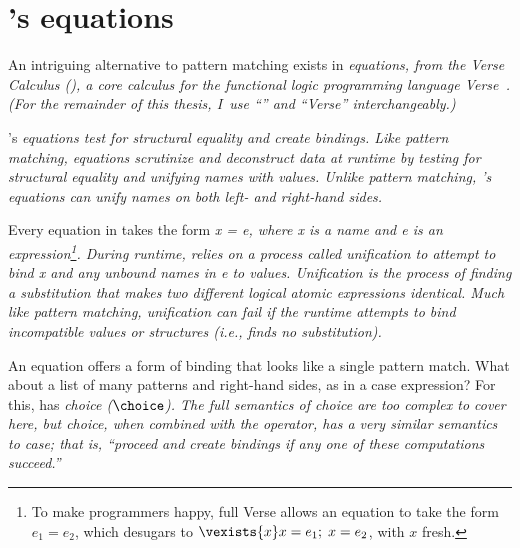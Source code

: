\documentclass[manuscript,screen,review, 12pt, nonacm]{acmart}
\begin{document}
    
    \section{\VC's equations}
    \label{verseoverobservers}

    An intriguing alternative to pattern matching exists in \it{equations}, from
    the Verse Calculus (\VC), a core calculus for the functional logic
    programming language \it{Verse}~\citep{antoy2010functional,
    hanus2013functional, verse}. (For the remainder of this thesis, I~use “\VC”
    and “Verse” interchangeably.)



    \VC's \it{equations} test for structural equality and create bindings. Like
    pattern matching, equations scrutinize and deconstruct data at runtime by
    testing for structural equality and unifying names with values. Unlike
    pattern matching, \VC's equations can unify names on both left- \it{and}
    right-hand sides. 

    Every equation in \VC takes the form \it{x = e}, where \it{x} is a name and
    \it{e} is an expression\footnote{To make programmers happy, full Verse
    allows an equation to take the form $e_{1} = e_{2}$, which desugars to
    $\vexists{x} x = e_{1};\; x = e_{2}$, with $x$ fresh.}. During runtime, \VC
    relies on a process called \it{unification} to attempt to bind \it{x} and
    any unbound names in \it{e} to values. Unification is the process of finding
    a substitution that makes two different logical atomic expressions
    identical. Much like pattern matching, unification can fail if the runtime
    attempts to bind incompatible values or structures (i.e., finds no
    substitution). 

    An equation offers a form of binding that looks like a single pattern match.
    What about a list of many patterns and right-hand sides, as in a case
    expression? For this, \VC has \it{choice} ($\choice$). The full semantics of
    choice are too complex to cover here, but choice, when combined with the
    \one operator, has a very similar semantics to case; that is, “proceed
    and create bindings if any one of these computations succeed.” 
\end{document}

